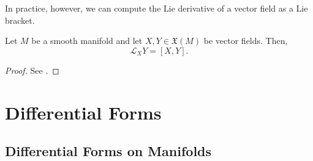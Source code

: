 \documentclass[a4paper,12pt]{article}
\begin{document}
In practice, however, we can compute the Lie derivative of a vector field as a Lie bracket.
\begin{proposition}\label{prop:lie_derivative_is_lie_bracket}
    Let $M$ be a smooth manifold and let $X, Y \in \mathfrak{X}(M)$ be vector fields.
    Then,
    \begin{equation}
        \mathcal{L}_X Y = [X, Y].
    \end{equation}
\end{proposition}
\begin{proof}
    See \cite[Thm.~9.38]{Lee2012}.
\end{proof}

\section{Differential Forms}\label{sec:differential_forms}

\subsection{Differential Forms on Manifolds}\label{subsec:differential_forms:differential_forms_on_manifolds}
\end{document}
